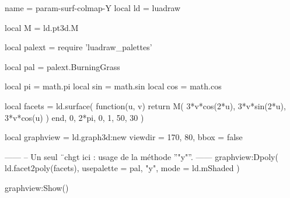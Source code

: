 \documentclass[border = 3pt]{standalone}
\begin{document}
\begin{luadraw*}{name = param-surf-colmap-Y}
local ld = luadraw

local M = ld.pt3d.M

local palext = require 'luadraw_palettes'

local pal = palext.BurningGrass

local pi  = math.pi
local sin = math.sin
local cos = math.cos

local facets = ld.surface(
  function(u, v)
    return M(
      3*v*cos(2*u),
      3*v*sin(2*u),
      3*v*cos(u)
    )
  end,
  0, 2*pi, 0, 1,
  {50, 30}
)

local graphview = ld.graph3d:new{
  viewdir = {170, 80},
  bbox    = false
}

------
-- Un seul ¨chgt ici : usage de la méthode ''"y"''.
------
graphview:Dpoly(
  ld.facet2poly(facets),
  {
    usepalette = {pal, "y"},
    mode       = ld.mShaded
  }
)

graphview:Show()
\end{luadraw*}
\end{document}
